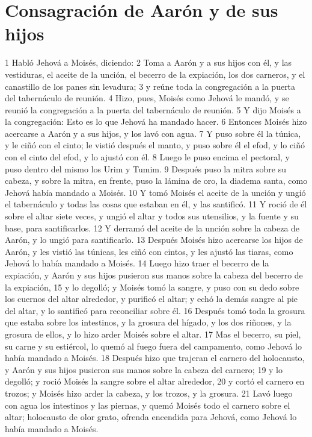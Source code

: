 \section{Consagración de Aarón y de sus hijos}

1 Habló Jehová a Moisés, diciendo:
2 Toma a Aarón y a sus hijos con él, y las vestiduras, el aceite de la unción, el becerro de la expiación, los dos carneros, y el canastillo de los panes sin levadura;
3 y reúne toda la congregación a la puerta del tabernáculo de reunión.
4 Hizo, pues, Moisés como Jehová le mandó, y se reunió la congregación a la puerta del tabernáculo de reunión.
5 Y dijo Moisés a la congregación: Esto es lo que Jehová ha mandado hacer.
6 Entonces Moisés hizo acercarse a Aarón y a sus hijos, y los lavó con agua.
7 Y puso sobre él la túnica, y le ciñó con el cinto; le vistió después el manto, y puso sobre él el efod, y lo ciñó con el cinto del efod, y lo ajustó con él.
8 Luego le puso encima el pectoral, y puso dentro del mismo los Urim y Tumim.
9 Después puso la mitra sobre su cabeza, y sobre la mitra, en frente, puso la lámina de oro, la diadema santa, como Jehová había mandado a Moisés.
10 Y tomó Moisés el aceite de la unción y ungió el tabernáculo y todas las cosas que estaban en él, y las santificó.
11 Y roció de él sobre el altar siete veces, y ungió el altar y todos sus utensilios, y la fuente y su base, para santificarlos.
12 Y derramó del aceite de la unción sobre la cabeza de Aarón, y lo ungió para santificarlo.
13 Después Moisés hizo acercarse los hijos de Aarón, y les vistió las túnicas, les ciñó con cintos, y les ajustó las tiaras, como Jehová lo había mandado a Moisés.
14 Luego hizo traer el becerro de la expiación, y Aarón y sus hijos pusieron sus manos sobre la cabeza del becerro de la expiación,
15 y lo degolló; y Moisés tomó la sangre, y puso con su dedo sobre los cuernos del altar alrededor, y purificó el altar; y echó la demás sangre al pie del altar, y lo santificó para reconciliar sobre él.
16 Después tomó toda la grosura que estaba sobre los intestinos, y la grosura del hígado, y los dos riñones, y la grosura de ellos, y lo hizo arder Moisés sobre el altar.
17 Mas el becerro, su piel, su carne y su estiércol, lo quemó al fuego fuera del campamento, como Jehová lo había mandado a Moisés.
18 Después hizo que trajeran el carnero del holocausto, y Aarón y sus hijos pusieron sus manos sobre la cabeza del carnero;
19 y lo degolló; y roció Moisés la sangre sobre el altar alrededor,
20 y cortó el carnero en trozos; y Moisés hizo arder la cabeza, y los trozos, y la grosura.
21 Lavó luego con agua los intestinos y las piernas, y quemó Moisés todo el carnero sobre el altar; holocausto de olor grato, ofrenda encendida para Jehová, como Jehová lo había mandado a Moisés.
